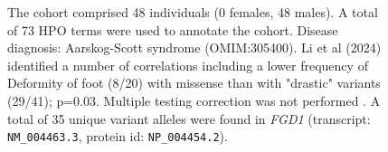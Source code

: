 \begin{figure}[htbp]
    \vspace{2em}
    
    \caption{ The cohort comprised 48 individuals (0 females, 48 males). A total of 73 HPO terms were used to annotate the cohort. Disease diagnosis: Aarskog-Scott syndrome (OMIM:305400). Li et al (2024) identified a number of correlations including a lower frequency of Deformity of foot	
    (8/20) with missense than with "drastic" variants (29/41); p=0.03. Multiple testing correction was not performed \cite{PMID_38411716,PMID_33762894}.  A total of 35 unique variant alleles were found in \textit{FGD1} (transcript: \texttt{NM\_004463.3}, protein id: \texttt{NP\_004454.2}).}
    \end{figure}
    